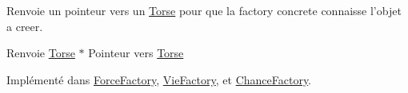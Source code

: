 Renvoie un pointeur vers un \hyperlink{class_torse}{Torse} pour que la factory concrete connaisse l'objet a creer. 

\begin{DoxyReturn}{Renvoie}
\hyperlink{class_torse}{Torse} $\ast$ Pointeur vers \hyperlink{class_torse}{Torse} 
\end{DoxyReturn}


Implémenté dans \hyperlink{class_force_factory_adfe688df9ecf92a00558d8922635713e}{Force\-Factory}, \hyperlink{class_vie_factory_a11bc6f64be3334f46bd0a9a288eeaeb3}{Vie\-Factory}, et \hyperlink{class_chance_factory_ad58fcb50621aec538e74e736e6a561d5}{Chance\-Factory}.

